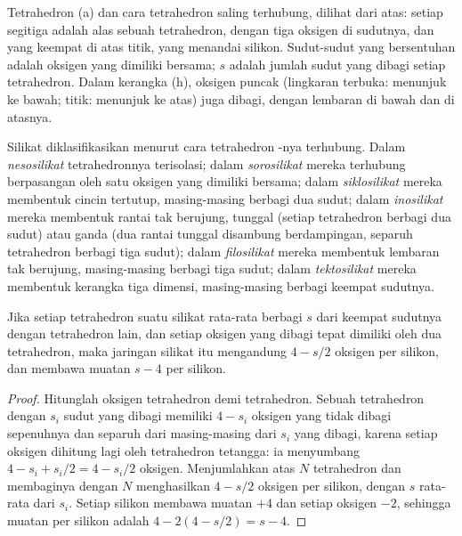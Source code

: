 \begin{omfigure}
{\small Tetrahedron  (a) dan cara tetrahedron saling terhubung, dilihat dari atas: setiap segitiga adalah alas sebuah tetrahedron, dengan tiga oksigen di sudutnya, dan yang keempat di atas titik, yang menandai silikon. Sudut-sudut yang bersentuhan adalah oksigen yang dimiliki bersama; $s$ adalah jumlah sudut yang dibagi setiap tetrahedron. Dalam kerangka (h), oksigen puncak (lingkaran terbuka: menunjuk ke bawah; titik: menunjuk ke atas) juga dibagi, dengan lembaran di bawah dan di atasnya.}
\end{omfigure}

\begin{definition}\label{def:b1:rock-forming-minerals:silicate-classes}
Silikat diklasifikasikan menurut cara tetrahedron -nya terhubung. Dalam \emph{nesosilikat} tetrahedronnya terisolasi; dalam \emph{sorosilikat} mereka terhubung berpasangan oleh satu oksigen yang dimiliki bersama; dalam \emph{siklosilikat} mereka membentuk cincin tertutup, masing-masing berbagi dua sudut; dalam \emph{inosilikat} mereka membentuk rantai tak berujung, tunggal (setiap tetrahedron berbagi dua sudut) atau ganda (dua rantai tunggal disambung berdampingan, separuh tetrahedron berbagi tiga sudut); dalam \emph{filosilikat} mereka membentuk lembaran tak berujung, masing-masing berbagi tiga sudut; dalam \emph{tektosilikat} mereka membentuk kerangka tiga dimensi, masing-masing berbagi keempat sudutnya.
\end{definition}

\begin{proposition}\label{prop:b1:rock-forming-minerals:si-o}
Jika setiap tetrahedron  suatu silikat rata-rata berbagi $s$ dari keempat sudutnya dengan tetrahedron lain, dan setiap oksigen yang dibagi tepat dimiliki oleh dua tetrahedron, maka jaringan silikat itu mengandung $4 - s/2$ oksigen per silikon, dan membawa muatan $s - 4$ per silikon.
\end{proposition}

\begin{proof}
Hitunglah oksigen tetrahedron demi tetrahedron. Sebuah tetrahedron dengan $s_i$ sudut yang dibagi memiliki $4 - s_i$ oksigen yang tidak dibagi sepenuhnya dan separuh dari masing-masing dari $s_i$ yang dibagi, karena setiap oksigen dihitung lagi oleh tetrahedron tetangga: ia menyumbang $4 - s_i + s_i/2 = 4 - s_i/2$ oksigen. Menjumlahkan atas $N$ tetrahedron dan membaginya dengan $N$ menghasilkan $4 - s/2$ oksigen per silikon, dengan $s$ rata-rata dari $s_i$. Setiap silikon membawa muatan $+4$ dan setiap oksigen $-2$, sehingga muatan per silikon adalah $4 - 2(4 - s/2) = s - 4$.
\end{proof}

